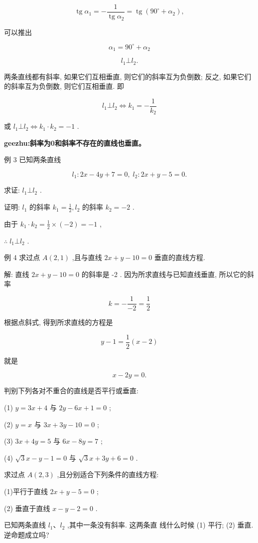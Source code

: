 \documentclass[lang=cn,newtx,10.5pt,scheme=chinese]{elegantbook}
\begin{document}
\[
  \operatorname{tg}{\alpha }_{1} = - \frac{1}{\operatorname{tg}{\alpha }_{2}} = \operatorname{tg}\left( {{90}^{ \circ } + {\alpha }_{2}}\right) ,
\]

可以推出

\[
    {\alpha }_{1} = {90}^{ \circ } + {\alpha }_{2}
\]

\[
    {l}_{1} \bot {l}_{2}\text{.}
\]
\begin{corollary}
两条直线都有斜率, 如果它们互相垂直, 则它们的斜率互为负倒数; 反之, 如果它们的斜率互为负倒数, 则它们互相垂直. 即

\[
    {l}_{1} \bot {l}_{2} \Leftrightarrow {k}_{1} = - \frac{1}{{k}_{2}}
\]

或 \({l}_{1} \bot {l}_{2} \Leftrightarrow {k}_{1} \cdot {k}_{2} = - 1\) .
\end{corollary}

\textbf{geezhu:斜率为0和斜率不存在的直线也垂直。}

例 3 已知两条直线

\[
    {l}_{1} : {2x} - {4y} + 7 = 0,\;{l}_{2} : {2x} + y - 5 = 0.
\]

求证: \({l}_{1} \bot {l}_{2}\) .

证明: \({l}_{1}\) 的斜率 \({k}_{1} = \frac{1}{2},{l}_{2}\) 的斜率 \({k}_{2} = - 2\) .

由于 \({k}_{1} \cdot {k}_{2} = \frac{1}{2} \times \left( {-2}\right) = - 1\) ,

\(\therefore \;{l}_{1} \bot {l}_{2}\) .

例 4 求过点 \(A\left( {2,1}\right)\) ,且与直线 \({2x} + y - {10} = 0\) 垂直的直线方程.

解: 直线 \({2x} + y - {10} = 0\) 的斜率是 -2 . 因为所求直线与已知直线垂直, 所以它的斜率

\[
  k = - \frac{1}{-2} = \frac{1}{2}
\]

根据点斜式, 得到所求直线的方程是

\[
  y - 1 = \frac{1}{2}\left( {x - 2}\right)
\]

就是

\[
  x - {2y} = 0.
\]

\begin{problemset}[练习]

\item 判别下列各对不重合的直线是否平行或垂直:

(1) \(y = {3x} + 4\) 与 \({2y} - {6x} + 1 = 0\) ;

(2) \(y = x\) 与 \({3x} + {3y} - {10} = 0\) ;

(3) \({3x} + {4y} = 5\) 与 \({6x} - {8y} = 7\) ;

(4) \(\sqrt{3}x - y - 1 = 0\) 与 \(\sqrt{3}x + {3y} + 6 = 0\) .

\item 求过点 \(A\left( {2,3}\right)\) ,且分别适合下列条件的直线方程:

(1)平行于直线 \({2x} + y - 5 = 0\) ;

(2) 垂直于直线 \(x - y - 2 = 0\) .

\item 已知两条直线 \({l}_{1}\text{、}{l}_{2}\) ,其中一条没有斜率. 这两条直 线什么时候 (1) 平行; (2) 垂直. 逆命题成立吗?
\end{problemset}
\end{document}

